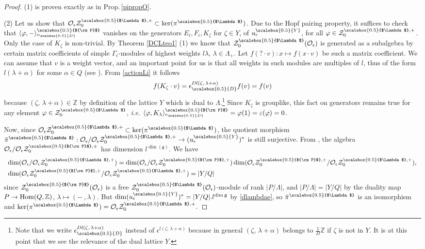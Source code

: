 \documentclass[11pt]{amsart}
\newcommand{\e}{\epsilon}
\newcommand{\mz}{\mathbb{Z}}
\newcommand{\eD}{\epsilon_{\scalebox{0.5}{D}}}
\newcommand{\Y}{{\scalebox{0.5}{Y}}}
\newcommand{\D}{{\scalebox{0.5}{D}}}
\newcommand{\Pup}{{\scalebox{0.5}{${\rm P}$}}}
\newcommand{\Lam}{{\scalebox{0.5}{$\Lambda$}}}
\begin{document}
\begin{proof}
(1) is proven exactly as in Prop.\,\ref{pipropO}.

(2) Let us show that $\mathcal{O}_\e\mathcal{Z}_{0}^{\Lam,+} \subset \ker(\pi^\Lam)$. Due to the Hopf pairing property, it suffices to check that $\langle \varphi , - \rangle_{\eD}^\Pup$ vanishes on the generators $E_i,F_i, K_{\zeta}$ for $\zeta \in Y$, of $u_\epsilon^\Y$, for all $\varphi \in \mathcal{Z}_0^{\Lam,+}$. Only the case of $K_{\zeta}$ is non-trivial. By Theorem \ref{DCLteo1} (1) we know that ${\mathcal Z}_0^\Lam({\mathcal O}_\e)$ is generated as a subalgebra by certain matrix coefficients of simple $\Gamma_\e$-modules of highest weights $l\lambda$, $\lambda\in \Lambda_+$. Let $f(?\cdot v) : x \mapsto f(x \cdot v)$ be such a matrix coefficient. We can assume that $v$ is a weight vector, and an important point for us is that all weights in such modules are multiples of $l$, thus of the form $l(\lambda + \alpha)$ for some $\alpha \in Q$ (see \cite[Remark on p.\,357]{CP}). From \eqref{actionLi} it follows
\[ f(K_{\zeta} \cdot v) = \e_\D^{Dl(\zeta, \, \lambda + \alpha)}f(v) = f(v) \]
because $(\zeta, \, \lambda + \alpha) \in \mathbb{Z}$ by definition of the lattice $Y$ which is dual to $\Lambda$.\footnote{Note that we write $\e_\D^{Dl(\zeta, \, \lambda + \alpha)}$ instead of $\e^{l(\zeta, \, \lambda + \alpha)}$ because in general $(\zeta, \, \lambda + \alpha)$ belongs to $\textstyle \frac{1}{D}\mathbb{Z}$ if $\zeta$ is not in $Y$. It is at this point that we see the relevance of the dual lattice $Y$.} Since $K_{\zeta}$ is grouplike, this fact on generators remains true for any element $\varphi \in {\mathcal Z}_{0}^{\Lam}$, \textit{i.e.} $\langle \varphi, K_{\lambda} \rangle_{\epsilon_\D}^\Pup = \varphi(1) = \varepsilon(\varphi)=0$.

\indent Now, since ${\mathcal O}_\epsilon {\mathcal Z}_{0}^{\Lam,+}\subset \ker(\pi^\Lam)$, the quotient morphism $\bar{\pi}^\Lam: {\mathcal O}_\e/{\mathcal O}_\epsilon {\mathcal Z}_{0}^{\Lam,+}\rightarrow (u_\epsilon^\Y)^{*}$ is still surjective. From \cite[\S III.7.7]{BG}, the algebra ${\mathcal O}_\e/{\mathcal O}_\epsilon {\mathcal Z}_{0}^{\Pup,+}$ has dimension $l^{\dim(\mathfrak g)}$. We have
\[ \begin{array}{l}
\dim({\mathcal O}_\e/{\mathcal O}_\epsilon {\mathcal Z}_{0}^{\Lam,+}) = \dim({\mathcal O}_\e/{\mathcal O}_\epsilon {\mathcal Z}_{0}^{\Pup,+}) \dim({\mathcal O}_\epsilon {\mathcal Z}_{0}^{\Pup,+}/{\mathcal O}_\epsilon {\mathcal Z}_{0}^{\Lam,+}),\\[.3em]
\dim({\mathcal O}_\epsilon {\mathcal Z}_{0}^{\Pup,+}/{\mathcal O}_\epsilon {\mathcal Z}_{0}^{\Lam,+}) = \vert Y/Q\vert
\end{array} \]
since ${\mathcal Z}_0^\Pup({\mathcal O}_\e)$ is a free ${\mathcal Z}_0^\Lam({\mathcal O}_\e)$-module of rank $\vert P/\Lambda \vert$, and $\vert P/\Lambda\vert = \vert Y/Q\vert$ by the duality map $P \to {\rm Hom}(Q,\mz)$, $\lambda \mapsto (- \ ,\lambda )$. But $\dim(u_\e^\Y)^{*}= \vert Y/Q\vert . l^{\dim {\mathfrak g}}$ by \eqref{dlambdae}, so $\bar{\pi}^\Lam$ is an isomorphism and $\ker(\pi^\Lam)={\mathcal O}_\epsilon {\mathcal Z}_{0}^{\Lam,+}.$
\end{proof}
\medskip
\end{document}
